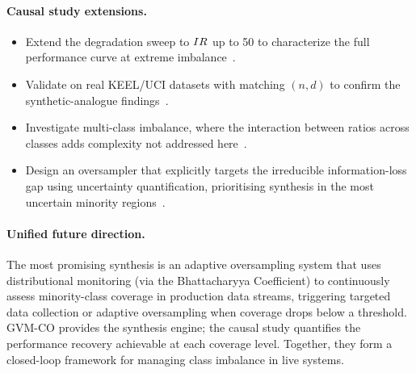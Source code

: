 \paragraph{Causal study extensions.}
\begin{itemize}[leftmargin=*]
  \item Extend the degradation sweep to $IR$ up to 50 to characterize the full performance curve at extreme imbalance~\cite{he2009learning}.
  \item Validate on real KEEL/UCI datasets with matching $(n, d)$ to confirm the synthetic-analogue findings~\cite{fernandez2018learning}.
  \item Investigate multi-class imbalance, where the interaction between ratios across classes adds complexity not addressed here~\cite{haixiang2017learning}.
  \item Design an oversampler that explicitly targets the irreducible information-loss gap using uncertainty quantification, prioritising synthesis in the most uncertain minority regions~\cite{he2008adasyn}.
\end{itemize}

\paragraph{Unified future direction.}
The most promising synthesis is an adaptive oversampling system that uses distributional monitoring (via the Bhattacharyya Coefficient) to continuously assess minority-class coverage in production data streams, triggering targeted data collection or adaptive oversampling when coverage drops below a threshold.
GVM-CO provides the synthesis engine; the causal study quantifies the performance recovery achievable at each coverage level.
Together, they form a closed-loop framework for managing class imbalance in live systems.
